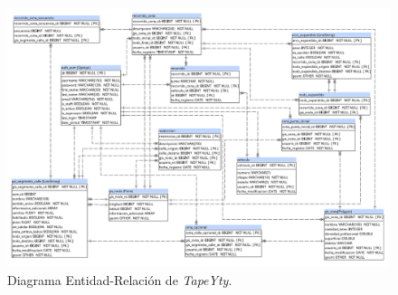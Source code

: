 \begin{landscape}
\begin{figure}[tbp]
\centerline{\includegraphics[height=\textheight]{20190716_DER.png}}
\caption{Diagrama Entidad-Relación de \textit{TapeYty}.}
\label{fig:DERTapeYty}
\end{figure}
\end{landscape}

